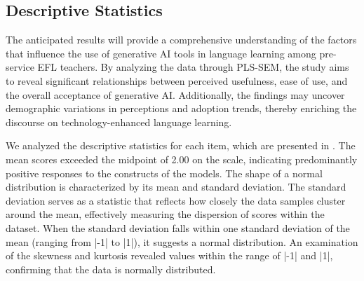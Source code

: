 \documentclass[english]{textolivre}
\begin{document}
\subsection{Descriptive Statistics}
The anticipated results will provide a comprehensive understanding of the factors that influence the use of generative AI tools in language learning among pre-service EFL teachers. By analyzing the data through PLS-SEM, the study aims to reveal significant relationships between perceived usefulness, ease of use, and the overall acceptance of generative AI. Additionally, the findings may uncover demographic variations in perceptions and adoption trends, thereby enriching the discourse on technology-enhanced language learning.

We analyzed the descriptive statistics for each item, which are presented in . The mean scores exceeded the midpoint of 2.00 on the scale, indicating predominantly positive responses to the constructs of the models. The shape of a normal distribution is characterized by its mean and standard deviation. The standard deviation serves as a statistic that reflects how closely the data samples cluster around the mean, effectively measuring the dispersion of scores within the dataset. When the standard deviation falls within one standard deviation of the mean (ranging from |-1| to |1|), it suggests a normal distribution. An examination of the skewness and kurtosis revealed values within the range of |-1| and |1|, confirming that the data is normally distributed.
\end{document}
